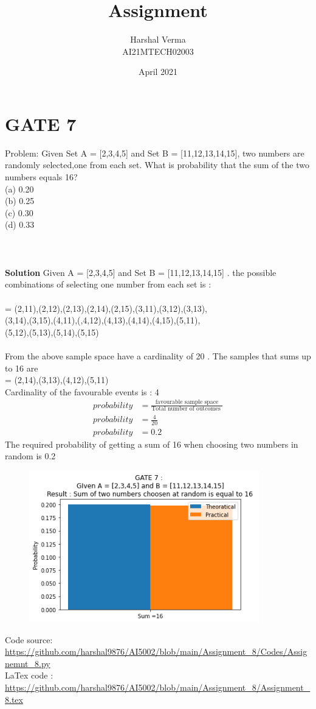 \documentclass[journal,12pt,twocolumn]{IEEEtran}
\title{Assignment  }
\author{Harshal Verma\\
AI21MTECH02003}
\date{April 2021}
\begin{document}
\maketitle
\section{GATE 7}
Problem: Given Set A = [2,3,4,5] and Set B =
[11,12,13,14,15], two numbers are randomly
selected,one from each set. What is probability
that the sum of the two numbers equals 16? \\
(a) 0.20\\
(b) 0.25\\
(c) 0.30\\
(d) 0.33
\\
\\
\\
\\
\textbf{Solution }
Given A = [2,3,4,5] and Set B = [11,12,13,14,15] . the possible combinations of selecting one number from each set is :\\
\\
=  {(2,11),(2,12),(2,13),(2,14),(2,15),(3,11),(3,12),(3,13),\\(3,14),(3,15),(4,11),(,4,12),(4,13),(4,14),(4,15),(5,11),\\(5,12),(5,13),(5,14),(5,15)}\\
\\
From the above sample space have a cardinality of 20 . The samples that sums up to 16 are \\
= {(2,14),(3,13),(4,12),(5,11)}\\
\smallskip
Cardinality of the favourable events is : 4
\smallskip
\begin{align*}
probability &= \frac{\text{favourable sample space}}{\text{Total number of outcomes }}\\
probability &= \frac{4}{20}\\
probability &= 0.2
\end{align*}
\smallskip
The required probability of getting a sum of 16 when choosing two numbers in random is 0.2 \\
\smallskip

\begin{figure}[htp]
    \centering
    \includegraphics[width=10cm]{Assignemnt_8}
    \label{fig :plot}
\end{figure}

\begin{tcolorbox}
Code source: \url{https://github.com/harshal9876/AI5002/blob/main/Assignment_8/Codes/Assignemnt_8.py} \\
LaTex code :
\url{https://github.com/harshal9876/AI5002/blob/main/Assignment_8/Assignment_8.tex}
\end{tcolorbox}
\vfill
\end{document}
